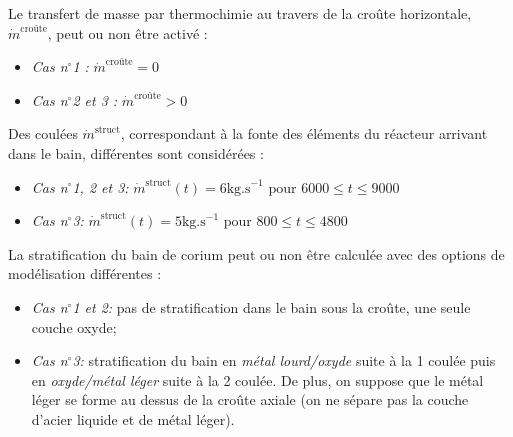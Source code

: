 \documentclass[3p]{elsarticle}
\begin{document}
Le transfert de masse par thermochimie au travers de la croûte horizontale, $\dot{m}^{\text{croûte}}$, peut ou non être activé :
\begin{itemize}
	\item \emph{Cas n$^{\circ}$1 :} $\dot{m}^{\text{croûte}} = 0$
	\item \emph{Cas n$^{\circ}$2 et 3 :} $\dot{m}^{\text{croûte}} > 0$
\end{itemize}

Des coulées $\dot{m}^{\text{struct}}$, correspondant à la fonte des éléments du réacteur arrivant dans le bain, différentes sont considérées : 
\begin{itemize}
	\item \emph{Cas n$^{\circ}$1, 2 et 3:} $\dot{m}^{\text{struct}}(t) = 6\text{kg.s}^{-1} \text{ pour } 6000\leq t\leq 9000$
	\item \emph{Cas n$^{\circ}$3:} $\dot{m}^{\text{struct}}(t) = 5\text{kg.s}^{-1} \text{ pour } 800\leq t\leq 4800$
\end{itemize}

La stratification du bain de corium peut ou non être calculée avec des options de modélisation différentes : 
\begin{itemize}
		\item \emph{Cas n$^{\circ}$1 et 2:} pas de stratification dans le bain sous la croûte, une seule couche oxyde;
		\item \emph{Cas n$^{\circ}$3:} stratification du bain en \emph{métal lourd/oxyde} suite à la 1\iere{} coulée puis en \emph{oxyde/métal léger} suite à la 2\ieme{} coulée. De plus, on suppose que le métal léger se forme au dessus de la croûte axiale (on ne sépare pas la couche d'acier liquide et de métal léger).
\end{itemize}
\end{document}
